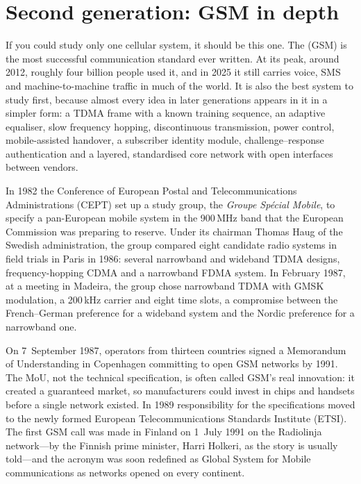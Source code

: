 \section{Second generation: GSM in depth}
\label{sec:ch21:gsm}

If you could study only one cellular system, it should be this one. The
 (GSM) is the most successful communication standard
ever written. At its peak, around 2012, roughly four billion people used it, and in 2025 it still
carries voice, SMS and machine-to-machine traffic in much of the world. It is also the best system to
study first, because almost every idea in later generations appears in it in a simpler form: a TDMA
frame with a known training sequence, an adaptive equaliser, slow frequency hopping, discontinuous
transmission, power control, mobile-assisted handover, a subscriber identity module,
challenge--response authentication and a layered, standardised core network with open interfaces
between vendors.


\begin{history}
In 1982 the Conference of European Postal and Telecommunications Administrations (CEPT) set up a
study group, the \emph{Groupe Spécial Mobile}, to specify a pan-European mobile system in the
900\,MHz band that the European Commission was preparing to reserve. Under its chairman Thomas Haug
of the Swedish administration, the group compared eight candidate radio systems in field trials in
Paris in 1986: several narrowband and wideband TDMA designs, frequency-hopping CDMA and a narrowband
FDMA system. In February 1987, at a meeting in Madeira, the group chose narrowband TDMA with GMSK
modulation, a 200\,kHz carrier and eight time slots, a compromise between the French--German
preference for a wideband system and the Nordic preference for a narrowband one.

On 7~September 1987, operators from thirteen countries signed a Memorandum of Understanding in
Copenhagen committing to open GSM networks by 1991. The MoU, not the technical specification, is
often called GSM's real innovation: it created a guaranteed market, so manufacturers could invest
in chips and handsets before a single network existed. In 1989 responsibility for the
specifications moved to the newly formed European Telecommunications Standards Institute (ETSI).
The first GSM call was made in Finland on 1~July 1991 on the Radiolinja network---by the Finnish
prime minister, Harri Holkeri, as the story is usually told---and the acronym was soon redefined as
Global System for Mobile communications as networks opened on every continent.
\end{history}

